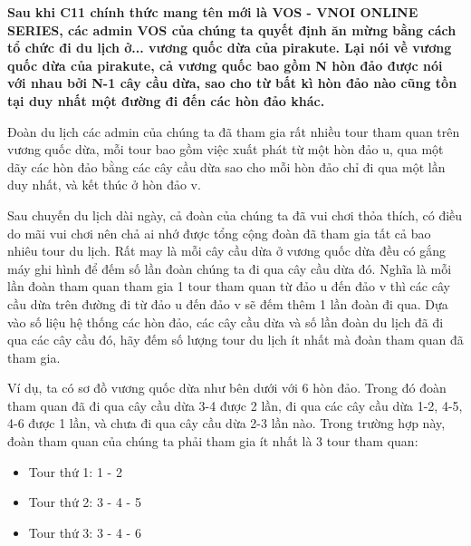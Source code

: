\textbf{Sau khi C11 chính thức mang tên mới là VOS - VNOI ONLINE SERIES, các admin VOS của chúng ta quyết định ăn mừng bằng cách tổ chức đi du lịch ở... vương quốc dừa của pirakute. Lại nói về vương quốc dừa của pirakute, cả vương quốc bao gồm \textbf{ N }\textbf{}\textbf{ hòn đảo được nói với nhau bởi }\textbf{\textbf{ N-1 }}\textbf{ cây cầu dừa, sao cho từ bất kì hòn đảo nào cũng tồn tại duy nhất một đường đi đến các hòn đảo khác. }}

Đoàn du lịch các admin của chúng ta đã tham gia rất nhiều tour tham quan trên vương quốc dừa, mỗi tour bao gồm việc xuất phát từ một hòn đảo u, qua một dãy các hòn đảo bằng các cây cầu dừa sao cho mỗi hòn đảo chỉ đi qua một lần duy nhất, và kết thúc ở hòn đảo v.

Sau chuyến du lịch dài ngày, cả đoàn của chúng ta đã vui chơi thỏa thích, có điều do mãi vui chơi nên chả ai nhớ được tổng cộng đoàn đã tham gia tất cả bao nhiêu tour du lịch. Rất may là mỗi cây cầu dừa ở vương quốc dừa đều có gắng máy ghi hình để đếm số lần đoàn chúng ta đi qua cây cầu dừa đó. Nghĩa là mỗi lần đoàn tham quan tham gia 1 tour tham quan từ đảo u đến đảo v thì các cây cầu dừa trên đường đi từ đảo u đến đảo v sẽ đếm thêm 1 lần đoàn đi qua. Dựa vào số liệu hệ thống các hòn đảo, các cây cầu dừa và số lần đoàn du lịch đã đi qua các cây cầu đó, hãy đếm số lượng tour du lịch ít nhất mà đoàn tham quan đã tham gia.

Ví dụ, ta có sơ đồ vương quốc dừa như bên dưới với 6 hòn đảo. Trong đó đoàn tham quan đã đi qua cây cầu dừa 3-4 được 2 lần, đi qua các cây cầu dừa 1-2, 4-5, 4-6 được 1 lần, và chưa đi qua cây cầu dừa 2-3 lần nào. Trong trường hợp này, đoàn tham quan của chúng ta phải tham gia ít nhất là 3 tour tham quan:
\begin{itemize}
	\item Tour thứ 1: 1 - 2
	\item Tour thứ 2: 3 - 4 - 5
	\item Tour thứ 3: 3 - 4 - 6
\end{itemize}